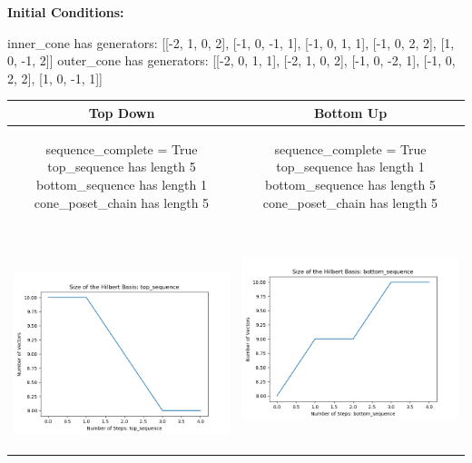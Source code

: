 \documentclass[10pt]{article}
\begin{document}
\textbf{Initial Conditions:}
\begin{SAGE}
inner_cone has generators: 
[[-2, 1, 0, 2], [-1, 0, -1, 1], [-1, 0, 1, 1], [-1, 0, 2, 2], [1, 0, -1, 2]]
outer_cone has generators: 
[[-2, 0, 1, 1], [-2, 1, 0, 2], [-1, 0, -2, 1], [-1, 0, 2, 2], [1, 0, -1, 1]]

\end{SAGE}
\begin{tabular}{c|c}
\textbf{Top Down} & \textbf{Bottom Up} \\ \hline  
\begin{SAGE}
	sequence_complete = True
	top_sequence has length 5
	bottom_sequence has length 1
	cone_poset_chain has length 5
\end{SAGE} 
&
\begin{SAGE}
	sequence_complete = True
	top_sequence has length 1
	bottom_sequence has length 5
	cone_poset_chain has length 5
\end{SAGE} 
\\ \hline
\
\begin{minipage}{.45\textwidth}
\includegraphics[width=\textwidth]{"DATA/4d/5 generators 2 bound B/top_sequence SIZE"}
\end{minipage} &
\begin{minipage}{.45\textwidth}
\includegraphics[width=\textwidth]{"DATA/4d/5 generators 2 bound B bottomup/bottom_sequence SIZE"}

\end{minipage}
\end{tabular}
\end{document}
